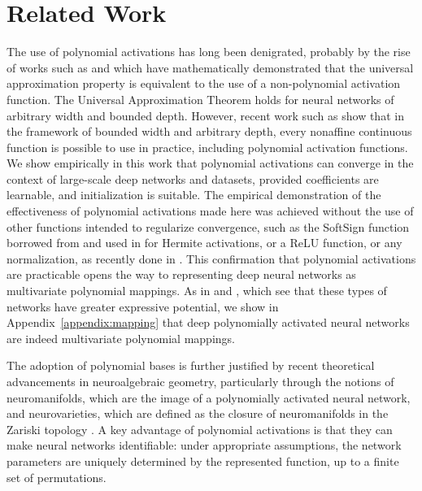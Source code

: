 \documentclass{article} %
\theoremstyle{plain}
\theoremstyle{definition}
\theoremstyle{remark}
\begin{document}
\section{Related Work}

The use of polynomial activations has long been denigrated, probably by the rise of works such as \cite{pinkus1999approximation} and \cite{leshno1993multilayer} which have mathematically demonstrated that the universal approximation property is equivalent to the use of a non-polynomial activation function. The Universal Approximation Theorem \cite{cybenko1989approximation,hornik1990universal} holds for neural networks of arbitrary width and bounded depth. However, recent work such as \cite{kidger2020universal,gaoglobal} show that in the framework of bounded width and arbitrary depth, every nonaffine continuous function is possible to use in practice, including polynomial activation functions. We show empirically in this work that polynomial activations can converge in the context of large-scale deep networks and datasets, provided coefficients are learnable, and initialization is suitable.
The empirical demonstration of the effectiveness of polynomial activations made here was achieved without the use of other functions intended to regularize convergence, such as the SoftSign function borrowed from \cite{turian2009quadratic} and used in \cite{lokhande2020generating} for Hermite activations, or a ReLU function, or any normalization, as recently done in \cite{zhuo2025polynomial}.
This confirmation that polynomial activations are practicable opens the way to representing deep neural networks as multivariate polynomial mappings. As in \cite{kileel2019expressive} and \cite{kubjas2024geometry}, which see that these types of networks have greater expressive potential, we show in Appendix~\ref{appendix:mapping} that deep polynomially activated neural networks are indeed multivariate polynomial mappings.

The adoption of polynomial bases is further justified by recent theoretical advancements in neuroalgebraic geometry, particularly through the notions of neuromanifolds, which are the image of a polynomially activated neural network, and neurovarieties,  which are defined as the closure of neuromanifolds
in the Zariski topology \cite{amari1994information, amari2001geometrical, amari2006singularities, calin2020deep}. A key advantage of polynomial activations is that they can make neural networks identifiable: under appropriate assumptions, the network parameters are uniquely determined by the represented function, up to a finite set of permutations.
\end{document}
